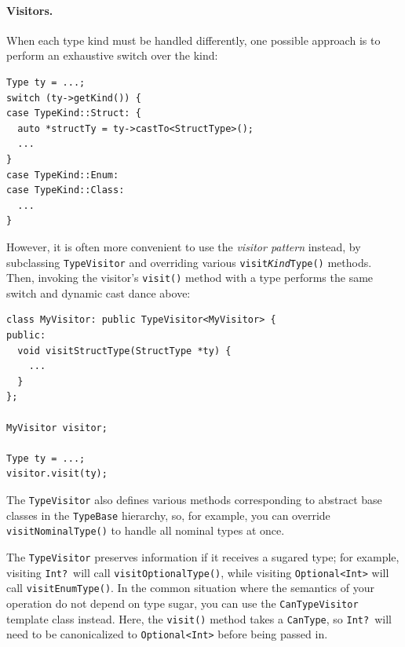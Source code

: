 \documentclass[../generics]{subfiles}
\begin{document}
\paragraph{Visitors.}
When each type kind must be handled differently, one possible approach is to perform an exhaustive switch over the kind:
\begin{Verbatim}
Type ty = ...;
switch (ty->getKind()) {
case TypeKind::Struct: {
  auto *structTy = ty->castTo<StructType>();
  ...
}
case TypeKind::Enum:
case TypeKind::Class:
  ...
}
\end{Verbatim}
However, it is often more convenient to use the \emph{visitor pattern} instead, by subclassing \texttt{TypeVisitor} and overriding various \texttt{visit\emph{Kind}Type()} methods. Then, invoking the visitor's \texttt{visit()} method with a type performs the same switch and dynamic cast dance above:
\begin{Verbatim}
class MyVisitor: public TypeVisitor<MyVisitor> {
public:
  void visitStructType(StructType *ty) {
    ...
  }
};

MyVisitor visitor;

Type ty = ...;
visitor.visit(ty);
\end{Verbatim}
The \texttt{TypeVisitor} also defines various methods corresponding to abstract base classes in the \texttt{TypeBase} hierarchy, so, for example, you can override \texttt{visitNominalType()} to handle all nominal types at once.

The \texttt{TypeVisitor} preserves information if it receives a sugared type; for example, visiting \texttt{Int?}\ will call \texttt{visitOptionalType()}, while visiting \texttt{Optional<Int>} will call \texttt{visitEnumType()}. In the common situation where the semantics of your operation do not depend on type sugar, you can use the \texttt{CanTypeVisitor} template class instead. Here, the \texttt{visit()} method takes a \texttt{CanType}, so \texttt{Int?}\ will need to be canonicalized to \texttt{Optional<Int>} before being passed in.
\end{document}
